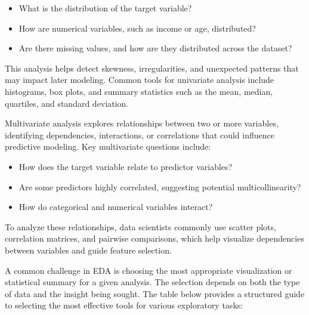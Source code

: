 \documentclass[
]{book}
\providecommand{\tightlist}{%
  \setlength{\itemsep}{0pt}\setlength{\parskip}{0pt}}
\theoremstyle{definition}
\theoremstyle{definition}
\theoremstyle{definition}
\theoremstyle{definition}
\theoremstyle{remark}
\begin{document}
\begin{itemize}
\tightlist
\item
  What is the distribution of the target variable?\\
\item
  How are numerical variables, such as income or age, distributed?\\
\item
  Are there missing values, and how are they distributed across the dataset?
\end{itemize}

This analysis helps detect skewness, irregularities, and unexpected patterns that may impact later modeling. Common tools for univariate analysis include histograms, box plots, and summary statistics such as the mean, median, quartiles, and standard deviation.

Multivariate analysis explores relationships between two or more variables, identifying dependencies, interactions, or correlations that could influence predictive modeling. Key multivariate questions include:

\begin{itemize}
\tightlist
\item
  How does the target variable relate to predictor variables?\\
\item
  Are some predictors highly correlated, suggesting potential multicollinearity?\\
\item
  How do categorical and numerical variables interact?
\end{itemize}

To analyze these relationships, data scientists commonly use scatter plots, correlation matrices, and pairwise comparisons, which help visualize dependencies between variables and guide feature selection.

A common challenge in EDA is choosing the most appropriate visualization or statistical summary for a given analysis. The selection depends on both the type of data and the insight being sought. The table below provides a structured guide to selecting the most effective tools for various exploratory tasks:
\end{document}
